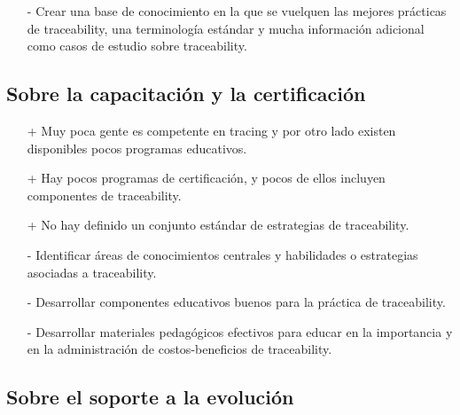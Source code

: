 \documentclass[a4paper,12pt,oneside]{book}
\begin{document}
\begin{itemize}
\item[-] Crear una base de conocimiento en la que se vuelquen las mejores prácticas de traceability, una terminología estándar y mucha información adicional como casos de estudio sobre traceability.
\end{itemize}

\subsection{Sobre la capacitación y la certificación}
\begin{itemize}
\item[+]     Muy poca gente es competente en tracing y por otro lado existen disponibles pocos programas educativos.
\item[+]    Hay pocos programas de certificación, y pocos de ellos incluyen componentes de traceability.
\item[+]   No hay definido un conjunto estándar de estrategias de traceability.
\end{itemize}

\begin{itemize}
\item[-]     Identificar áreas de conocimientos centrales y habilidades o estrategias asociadas a traceability.
\item[-]   Desarrollar componentes educativos buenos para la práctica de traceability.
\item[-]   Desarrollar materiales pedagógicos efectivos para educar en la importancia y en la administración de costos-beneficios de traceability.
\end{itemize}

\subsection{Sobre el soporte a la evolución}
\end{document}
